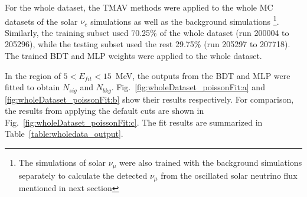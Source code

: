 {For the whole dataset, the TMAV methods were applied to the whole MC datasets of the solar $\nu_e$ simulations as well as the background simulations \footnote{The simulations of solar $\nu_{\mu}$ were also trained with the background simulations separately to calculate the detected $\nu_\mu$ from the oscillated solar neutrino flux mentioned in next section}. Similarly, the training subset used 70.25\% of the whole dataset (run 200004 to 205296), while the testing subset used the rest 29.75\% (run 205297 to 207718). The trained BDT and MLP weights were applied to the whole dataset.

In the region of $5<E_{fit}<15$~MeV, the outputs from the BDT and MLP were fitted to obtain $N_{sig}$ and $N_{bkg}$. Fig.~\ref{fig:wholeDataset_poissonFit:a} and \ref{fig:wholeDataset_poissonFit:b} show their results respectively. For comparison, the results from applying the default cuts are shown in Fig.~\ref{fig:wholeDataset_poissonFit:c}. The fit results are summarized in Table~\ref{table:wholedata_output}. 

}
